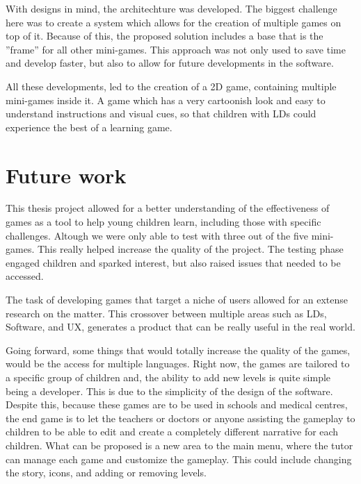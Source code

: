 With designs in mind, the architechture was developed. The biggest challenge here was to create a system which allows for the creation of multiple games on top of it. Because of this, the proposed solution includes a base that is the ''frame'' for all other mini-games. This approach was not only used to save time and develop faster, but also to allow for future developments in the software. 


All these developments, led to the creation of a 2D game, containing multiple mini-games inside it. A game which has a very cartoonish look and easy to understand instructions and visual cues, so that children with LDs could experience the best of a learning game.


\newpage
\section{Future work}

This thesis project allowed for a better understanding of the effectiveness of games as a tool to help young children learn, including those with specific challenges. Altough we were only able to test with three out of the five mini-games. This really helped increase the quality of the project. The testing phase engaged children and sparked interest, but also raised issues that needed to be accessed.

The task of developing games that target a niche of users allowed for an extense research on the matter. This crossover between multiple areas such as LDs, Software, and UX, generates a product that can be really useful in the real world. 

Going forward, some things that would totally increase the quality of the games, would be the access for multiple languages. Right now, the games are tailored to a specific group of children and, the ability to add new levels is quite simple being a developer. This is due to the simplicity of the design of the software. Despite this, because these games are to be used in schools and medical centres, the end game is to let the teachers or doctors or anyone assisting the gameplay to children to be able to edit and create a completely different narrative for each children. What can be proposed is a new area to the main menu, where the tutor can manage each game and customize the gameplay. This could include changing the story, icons, and adding or removing levels.

